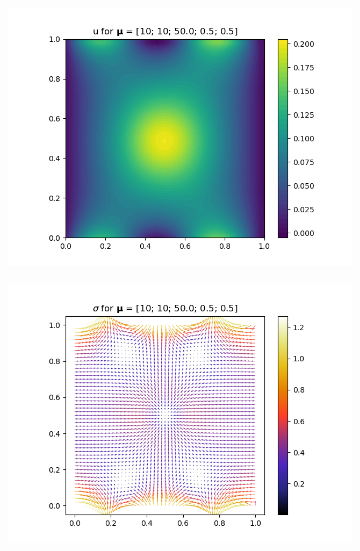 \begin{figure}[!htb]
    \centering
    \begin{subfigure}{0.35\linewidth}
        \centering
        \includegraphics[width=\linewidth]{figs/mixed_u_mu11.png}
        \label{subfig:mu11_a}
    \end{subfigure}%
    \begin{subfigure}{0.35\linewidth}
        \centering
        \includegraphics[width=\linewidth]{figs/mixed_sig_mu11.png}
        \label{subfig:mu11_b}
    \end{subfigure}%
    \begin{subfigure}{0.35\linewidth}

\end{subfigure}
\end{figure}
